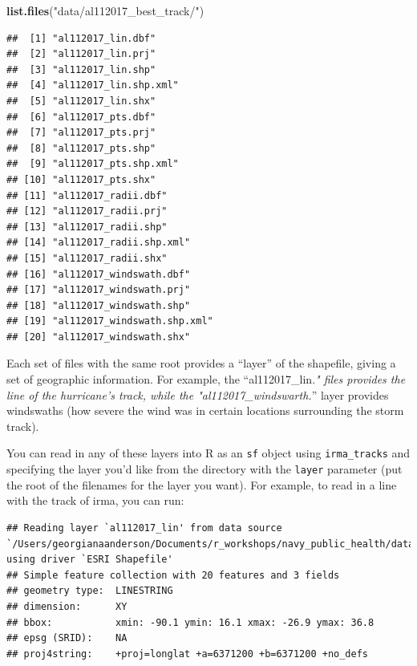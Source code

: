 \documentclass[]{tufte-book}
\newenvironment{Shaded}{}{}
\newcommand{\DataTypeTok}[1]{\textcolor[rgb]{0.56,0.13,0.00}{#1}}
\newcommand{\DecValTok}[1]{\textcolor[rgb]{0.25,0.63,0.44}{#1}}
\newcommand{\KeywordTok}[1]{\textcolor[rgb]{0.00,0.44,0.13}{\textbf{#1}}}
\newcommand{\NormalTok}[1]{#1}
\newcommand{\OperatorTok}[1]{\textcolor[rgb]{0.40,0.40,0.40}{#1}}
\newcommand{\StringTok}[1]{\textcolor[rgb]{0.25,0.44,0.63}{#1}}
\begin{document}
\begin{Shaded}
\begin{Highlighting}[]
\KeywordTok{list.files}\NormalTok{(}\StringTok{"data/al112017_best_track/"}\NormalTok{)}
\end{Highlighting}
\end{Shaded}

\begin{verbatim}
##  [1] "al112017_lin.dbf"          
##  [2] "al112017_lin.prj"          
##  [3] "al112017_lin.shp"          
##  [4] "al112017_lin.shp.xml"      
##  [5] "al112017_lin.shx"          
##  [6] "al112017_pts.dbf"          
##  [7] "al112017_pts.prj"          
##  [8] "al112017_pts.shp"          
##  [9] "al112017_pts.shp.xml"      
## [10] "al112017_pts.shx"          
## [11] "al112017_radii.dbf"        
## [12] "al112017_radii.prj"        
## [13] "al112017_radii.shp"        
## [14] "al112017_radii.shp.xml"    
## [15] "al112017_radii.shx"        
## [16] "al112017_windswath.dbf"    
## [17] "al112017_windswath.prj"    
## [18] "al112017_windswath.shp"    
## [19] "al112017_windswath.shp.xml"
## [20] "al112017_windswath.shx"
\end{verbatim}

Each set of files with the same root provides a ``layer'' of the shapefile, giving a set
of geographic information. For example, the ``al112017\_lin.\emph{" files provides the
line of the hurricane's track, while the "al112017\_windswarth.}'' layer provides windswaths
(how severe the wind was in certain locations surrounding the storm track).

You can read in any of these layers into R as an \texttt{sf} object using \texttt{irma\_tracks} and specifying
the layer you'd like from the directory with the \texttt{layer} parameter (put the root of the filenames
for the layer you want). For example, to read in a line with the track of irma, you can run:

\begin{Shaded}
\end{Shaded}

\begin{verbatim}
## Reading layer `al112017_lin' from data source `/Users/georgianaanderson/Documents/r_workshops/navy_public_health/data/al112017_best_track' using driver `ESRI Shapefile'
## Simple feature collection with 20 features and 3 fields
## geometry type:  LINESTRING
## dimension:      XY
## bbox:           xmin: -90.1 ymin: 16.1 xmax: -26.9 ymax: 36.8
## epsg (SRID):    NA
## proj4string:    +proj=longlat +a=6371200 +b=6371200 +no_defs
\end{verbatim}
\end{document}
